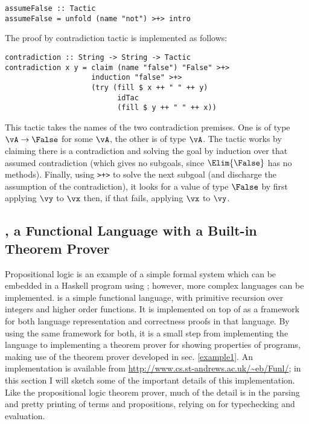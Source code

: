 \begin{verbatim}
assumeFalse :: Tactic
assumeFalse = unfold (name "not") >+> intro 
\end{verbatim}

The proof by contradiction tactic
is implemented as follows:
\\

\begin{verbatim}
contradiction :: String -> String -> Tactic
contradiction x y = claim (name "false") "False" >+>
                    induction "false" >+>
                    (try (fill $ x ++ " " ++ y)
                          idTac
                          (fill $ y ++ " " ++ x))
\end{verbatim}

This tactic takes the names of the two contradiction premises. One is
of type $\vA\to\False$ for some $\vA$, the other is of type $\vA$. The
tactic works by claiming there is a contradiction and solving the goal
by induction over that assumed contradiction (which gives no subgoals,
since $\Elim{\False}$ has no methods). Finally, using \texttt{>+>} to
solve the next subgoal (and discharge the assumption of the
contradiction), it looks for a value of type $\False$ by first
applying $\vy$ to $\vx$ then, if that fails, applying $\vx$ to $\vy$.

\subsection{\Funl{}, a Functional Language with a Built-in Theorem Prover}

\label{example2}

Propositional logic is an example of a simple formal system which can
be embedded in a Haskell program using \Ivor{}; however, more complex
languages can be implemented. \Funl{} is a simple functional language,
with primitive recursion over integers and higher order functions. It
is implemented on top of \Ivor{} as a framework for both language
representation and correctness proofs in that language. By using the
same framework for both, it is a small step from implementing the
language to implementing a theorem prover for showing properties of
programs, making use of the theorem prover developed
in sec. \ref{example1}.
An implementation is available from
\url{http://www.cs.st-andrews.ac.uk/~eb/Funl/}; in this section I will
sketch some of the important details of this implementation. Like the
propositional logic theorem prover, much of the detail is in the
parsing and pretty printing of terms and propositions, relying on
\Ivor{} for typechecking and evaluation.

